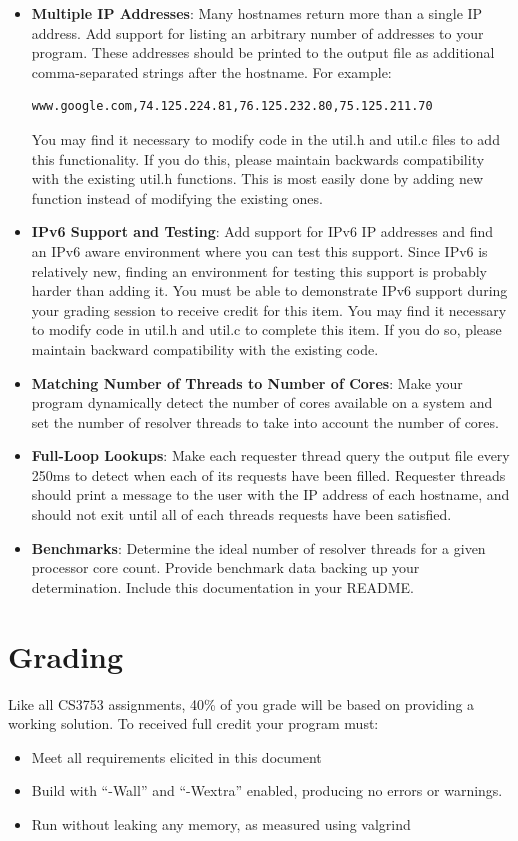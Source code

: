 \documentclass[12pt]{article}
\begin{document}
\begin{itemize}
\item {\bf Multiple IP Addresses}: Many hostnames return more than a
  single IP address. Add support for listing an arbitrary number of
  addresses to your program. These addresses should be printed to the
  output file as additional comma-separated strings after the
  hostname. For example:
\begin{verbatim}
www.google.com,74.125.224.81,76.125.232.80,75.125.211.70
\end{verbatim}
You may find it necessary to modify code in the util.h and util.c
files to add this functionality. If you do this, please maintain
backwards compatibility with the existing util.h functions. This is
most easily done by adding new function instead of modifying the
existing ones.
\item {\bf IPv6 Support and Testing}: Add support for IPv6 IP
  addresses and find an IPv6 aware environment where you can test this
  support. Since IPv6 is relatively new, finding an environment
  for testing this support is probably harder than adding it. You must
  be able to demonstrate IPv6 support during your grading session to receive
  credit for this item. You may find it necessary to modify code in
  util.h and util.c to complete this item. If you do so, please
  maintain backward compatibility with the existing code.
\item {\bf Matching Number of Threads to Number of Cores}:
  Make your program dynamically detect the number of cores available on a
  system and set the number of resolver threads to take into account
  the number of cores.
\item {\bf Full-Loop Lookups}: Make each requester thread query the
  output file every 250ms to detect when each of its requests have
  been filled. Requester threads should print a message to the user
  with the IP address of each hostname, and should not exit until all
  of each threads requests have been satisfied.
\item {\bf Benchmarks}: Determine the ideal number of resolver threads
  for a given processor core count. Provide benchmark data backing up
  your determination. Include this documentation in your README.
\end{itemize}

\section{Grading}

Like all CS3753 assignments, 40\% of you grade will be based on
providing a working solution. To received full credit
your program must:
\begin{itemize}
\item Meet all requirements elicited in this document
\item Build with ``-Wall'' and ``-Wextra'' enabled, producing no errors
  or warnings.
\item Run without leaking any memory, as measured using valgrind
\end{itemize}
\end{document}
